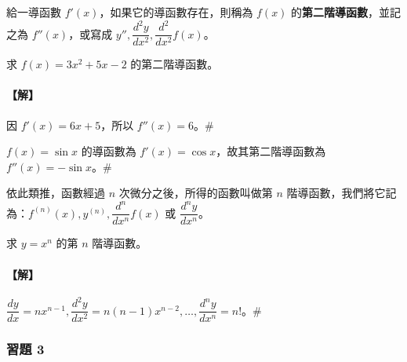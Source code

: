 給一導函數 $f'(x)$，如果它的導函數存在，則稱為 $f(x)$ 的\textbf{第二階導函數}，並記之為 $f''(x)$，或寫成 $y'', \dfrac{d^2 y}{dx^2}, \dfrac{d^2}{dx^2}f(x)$。

\begin{example}\label{ex:b6-app4-15}
求 $f(x)=3x^2+5x-2$ 的第二階導函數。
\end{example}

\paragraph{【解】}
因 $f'(x)=6x+5$，所以 $f''(x)=6$。\hfill$\#$

\begin{example}\label{ex:b6-app4-16}
$f(x)=\sin x$ 的導函數為 $f'(x)=\cos x$，故其第二階導函數為 $f''(x)=-\sin x$。\hfill$\#$
\end{example}

依此類推，函數經過 $n$ 次微分之後，所得的函數叫做第 $n$ 階導函數，我們將它記為：$f^{(n)}(x), y^{(n)}, \dfrac{d^n}{dx^n}f(x)$ 或 $\dfrac{d^n y}{dx^n}$。

\begin{example}\label{ex:b6-app4-17}
求 $y=x^n$ 的第 $n$ 階導函數。
\end{example}

\paragraph{【解】}
$\dfrac{dy}{dx} = nx^{n-1}, \dfrac{d^2 y}{dx^2} = n(n-1)x^{n-2}, \dots, \dfrac{d^n y}{dx^n} = n!$。\hfill$\#$

\subsubsection*{習題 3}\label{sec:b6-ex-app4-3}

